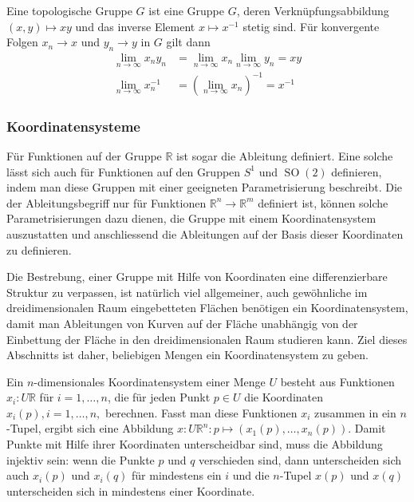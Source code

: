 \begin{definition}
\label{buch:gruppen:gruppe:def:topgruppe}
Eine topologische Gruppe $G$ ist eine Gruppe $G$, deren Verknüpfungsabbildung
$(x,y)\mapsto xy$ und das inverse Element $x\mapsto x^{-1}$ stetig sind.
Für konvergente Folgen $x_n\to x$ und $y_n\to y$ in $G$ gilt dann
\begin{align*}
\lim_{n\to \infty} x_ny_n &= \lim_{n\to\infty} x_n \lim_{n\to\infty} y_n = xy
\\
\lim_{n\to \infty} x_n^{-1} &= (\lim_{n\to\infty} x_n)^{-1} = x^{-1}
\end{align*}
\end{definition}

%
%
\subsubsection{Koordinatensysteme}
Für Funktionen auf der Gruppe $\mathbb{R}$ ist sogar die Ableitung
definiert.
Eine solche lässt sich auch für Funktionen auf den Gruppen 
$S^1$ und $\operatorname{SO}(2)$ definieren, indem man diese Gruppen
mit einer geeigneten Parametrisierung beschreibt.
Die der Ableitungsbegriff nur für Funktionen $\mathbb{R}^n \to\mathbb{R}^m$
definiert ist, können solche Parametrisierungen dazu dienen,
die Gruppe mit einem Koordinatensystem auszustatten und anschliessend
die Ableitungen auf der Basis dieser Koordinaten zu definieren.

Die Bestrebung, einer Gruppe mit Hilfe von Koordinaten eine differenzierbare
Struktur zu verpassen, ist natürlich viel allgemeiner, auch
gewöhnliche im dreidimensionalen Raum eingebetteten Flächen
benötigen ein Koordinatensystem, damit man Ableitungen von Kurven
auf der Fläche unabhängig von der Einbettung der Fläche in den
dreidimensionalen Raum studieren kann.
Ziel dieses Abschnitts ist daher, beliebigen Mengen ein Koordinatensystem
zu geben.

Ein $n$-dimensionales Koordinatensystem einer Menge $U$ besteht
aus Funktionen $x_i\colon U\mathbb{R}$ für $i=1,\dots,n$, die für
jeden Punkt $p\in U$ die Koordinaten $x_i(p),i=1,\dots,n,$ berechnen.
Fasst man diese Funktionen $x_i$ zusammen in ein $n$-Tupel, ergibt
sich eine Abbildung $x\colon U\mathbb{R}^n:p\mapsto (x_1(p),\dots,x_n(p))$.
Damit Punkte mit Hilfe ihrer Koordinaten unterscheidbar sind, muss
die Abbildung injektiv sein: wenn die Punkte $p$ und $q$ verschieden sind,
dann unterscheiden sich auch $x_i(p)$ und $x_i(q)$ für mindestens ein $i$
und die $n$-Tupel $x(p)$ und $x(q)$ unterscheiden sich in mindestens
einer Koordinate.

